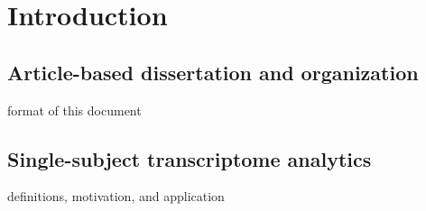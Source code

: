 \chapter{Introduction}\label{Chap:Intro}

\section{Article-based dissertation and organization}\label{sec:org}
format of this document

\section{Single-subject transcriptome analytics}\label{sec:nof1}

\indent \indent definitions, motivation, and application

